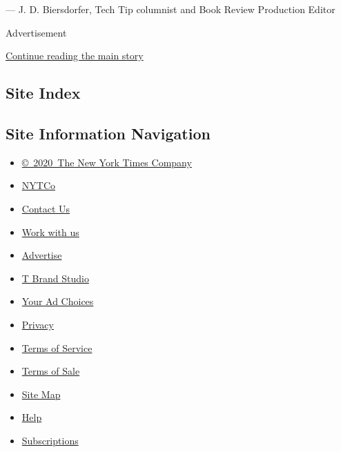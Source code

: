 --- J. D. Biersdorfer, Tech Tip columnist and Book Review Production
Editor

Advertisement

\protect\hyperlink{after-bottom}{Continue reading the main story}

\hypertarget{site-index}{%
\subsection{Site Index}\label{site-index}}

\hypertarget{site-information-navigation}{%
\subsection{Site Information
Navigation}\label{site-information-navigation}}

\begin{itemize}
\tightlist
\item
  \href{https://help.nytimes3xbfgragh.onion/hc/en-us/articles/115014792127-Copyright-notice}{©~2020~The
  New York Times Company}
\end{itemize}

\begin{itemize}
\tightlist
\item
  \href{https://www.nytco.com/}{NYTCo}
\item
  \href{https://help.nytimes3xbfgragh.onion/hc/en-us/articles/115015385887-Contact-Us}{Contact
  Us}
\item
  \href{https://www.nytco.com/careers/}{Work with us}
\item
  \href{https://nytmediakit.com/}{Advertise}
\item
  \href{http://www.tbrandstudio.com/}{T Brand Studio}
\item
  \href{https://www.nytimes3xbfgragh.onion/privacy/cookie-policy\#how-do-i-manage-trackers}{Your
  Ad Choices}
\item
  \href{https://www.nytimes3xbfgragh.onion/privacy}{Privacy}
\item
  \href{https://help.nytimes3xbfgragh.onion/hc/en-us/articles/115014893428-Terms-of-service}{Terms
  of Service}
\item
  \href{https://help.nytimes3xbfgragh.onion/hc/en-us/articles/115014893968-Terms-of-sale}{Terms
  of Sale}
\item
  \href{https://spiderbites.nytimes3xbfgragh.onion}{Site Map}
\item
  \href{https://help.nytimes3xbfgragh.onion/hc/en-us}{Help}
\item
  \href{https://www.nytimes3xbfgragh.onion/subscription?campaignId=37WXW}{Subscriptions}
\end{itemize}
